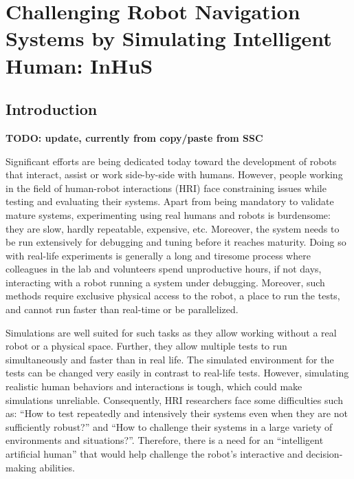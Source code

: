 \ifdefined{}
\else
\setcounter{chapter}{6} %
\dominitoc
\faketableofcontents
\fi

\chapter{Challenging Robot Navigation Systems by Simulating Intelligent Human: InHuS}
\label{chap:7}
\minitoc


\section{Introduction}

\textbf{TODO: update, currently from copy/paste from SSC}

Significant efforts are being dedicated today toward the development of robots that interact, assist or work side-by-side with humans. However, people working in the field of human-robot interactions (HRI) face constraining issues while testing and evaluating their systems. 
Apart from being mandatory to validate mature systems, experimenting using real humans and robots is burdensome: they are slow, hardly repeatable, expensive, etc. Moreover, the system needs to be run extensively for debugging and tuning before it reaches maturity. Doing so with real-life experiments is generally a long and tiresome process where colleagues in the lab and volunteers spend unproductive hours, if not days, interacting with a robot running a system under debugging. Moreover, such methods require exclusive physical access to the robot, a place to run the tests, and cannot run faster than real-time or be parallelized.

Simulations are well suited for such tasks as they allow working without a real robot or a physical space. Further, they allow multiple tests to run simultaneously and faster than in real life. The simulated environment for the tests can be changed very easily in contrast to real-life tests. However, simulating realistic human behaviors and interactions is tough, which could make simulations unreliable. Consequently, HRI researchers face some difficulties such as: ``How to test repeatedly and intensively their systems even when they are not sufficiently robust?'' and ``How to challenge their systems in a large variety of environments and situations?''. Therefore, there is a need for an ``intelligent artificial human'' that would help challenge the robot's interactive and decision-making abilities. 

